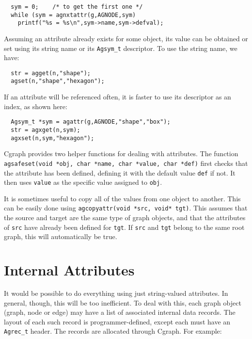 \documentclass[11pt,letterpaper]{article}
\begin{document}
\begin{verbatim}
  sym = 0;    /* to get the first one */
  while (sym = agnxtattr(g,AGNODE,sym)
    printf("%s = %s\n",sym->name,sym->defval);
\end{verbatim}

Assuming an attribute already exists for some object, its value can be
obtained or set using its string name or its \verb"Agsym_t" descriptor.
To use the string name, we have:

\begin{verbatim}
  str = agget(n,"shape");
  agset(n,"shape","hexagon");
\end{verbatim}

If an attribute will be referenced often, it is faster to
use its descriptor as an index, as shown here:

\begin{verbatim}
  Agsym_t *sym = agattr(g,AGNODE,"shape","box");
  str = agxget(n,sym);
  agxset(n,sym,"hexagon");
\end{verbatim}

Cgraph provides two helper functions for dealing with attributes. The function
\verb"agsafeset(void *obj, char *name, char *value, char *def)" first checks
that the attribute has been defined, defining it with the default value \verb"def"
if not. It then uses \verb"value" as the specific value assigned to \verb"obj".

It is sometimes useful to copy all of the values from one object to another. This can
be easily done using \verb"agcopyattr(void *src, void* tgt)". This assumes that the
source and target are the same type of graph objects, and that the attributes of
\verb"src" have already been defined for \verb"tgt". If \verb"src" and \verb"tgt"
belong to the same root graph, this will automatically be true.

\section{Internal Attributes}
\label{sec:internalattributes}

It would be possible to do everything using just string-valued
attributes. In general, though, this will be too inefficient.
To deal with this,
each graph object (graph, node or edge) may have a list of
associated internal data records.  The layout of each such
record is programmer-defined, except each must have an
\verb"Agrec_t" header.  The records are allocated through
Cgraph.  For example:
\end{document}
